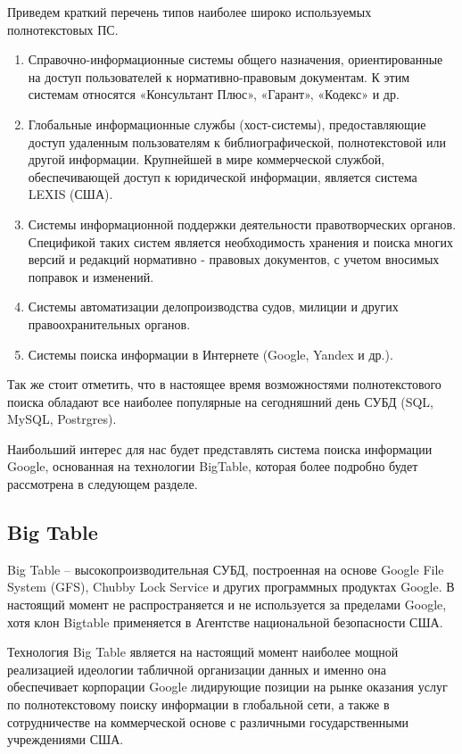 Приведем краткий перечень типов наиболее широко используемых полнотекстовых ПС.
\begin{enumerate}
\item Справочно-информационные системы общего назначения, ориентированные на доступ пользователей к нормативно-правовым документам. К этим системам относятся «Консультант Плюс», «Гарант», «Кодекс» и др. 
\item Глобальные информационные службы (хост-системы), предоставляющие доступ удаленным пользователям к библиографической, полнотекстовой или другой информации. Крупнейшей в мире коммерческой службой, обеспечивающей доступ к юридической информации, является система LEXIS (США). 
\item Системы информационной поддержки деятельности правотворческих органов. Спецификой таких систем является необходимость хранения и поиска многих версий и редакций нормативно - правовых документов, с учетом вносимых поправок и изменений. 
\item Системы автоматизации делопроизводства судов, милиции и других правоохранительных органов.
\item Системы поиска информации в Интернете (Google, Yandex и др.).
\end{enumerate}

Так же стоит отметить, что в настоящее время возможностями полнотекстового поиска обладают все наиболее популярные на сегодняшний день СУБД (SQL, MySQL, Postrgres).

Наибольший интерес для нас будет представлять система поиска информации Google, основанная на технологии BigTable, которая более подробно будет рассмотрена  в следующем разделе. 
\subsection{Big Table}
Big Table -- высокопроизводительная СУБД, построенная на основе Google File System (GFS), Chubby Lock Service и  других программных продуктах Google. В настоящий момент не распространяется и не используется за пределами Google, хотя клон Bigtable применяется в Агентстве национальной безопасности США.

Технология  Big Table  является на настоящий момент наиболее мощной реализацией идеологии табличной организации данных и именно она обеспечивает корпорации Google лидирующие позиции на рынке оказания услуг по полнотекстовому поиску информации в глобальной сети, а также в сотрудничестве на коммерческой основе с различными государственными учреждениями США.

